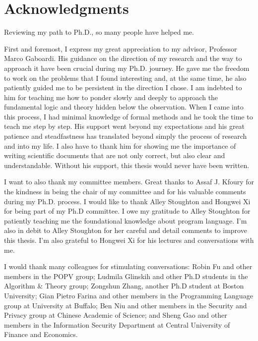 \section*{Acknowledgments}


Reviewing my path to Ph.D., so many people have helped me.


First and foremost, I express my great appreciation to my advisor, Professor Marco Gaboardi.
His guidance on the direction of my research and the way to approach it have been crucial during my Ph.D. journey.
He gave me the freedom to work on the problems that I found interesting and, at the same time,
he also patiently guided me to be persistent in the direction I chose.
I am indebted to him for teaching me how to ponder slowly and deeply to approach the fundamental logic and theory
hidden below the observation. When I came into this process, I had minimal knowledge of formal methods and he took the time to teach me step by step. 
His support went beyond my expectations and
his great patience and steadfastness has translated beyond simply the process of research and into my life. 
I also have to thank him for showing me the importance of writing scientific documents that are not only correct, but also clear and understandable.
Without his support, this thesis would never have been written.


I want to also thank my committee members.
Great thanks to Assaf J. Kfoury for the kindness in being the chair of my committee and for his valuable comments during my Ph.D. process.
I would like to thank Alley Stoughton and Hongwei Xi for being part of my Ph.D committee.
I owe my gratitude to Alley Stoughton for patiently teaching me the foundational knowledge
about program language.
I'm also in debit to Alley Stoughton for her careful and detail comments to improve this thesis.
I'm also grateful to Hongwei Xi for his lectures and conversations with me.




I would thank many colleagues for stimulating conversations:
Robin Fu and other members in the POPV group;
Ludmila Glinskih and other Ph.D students in the Algorithm \& Theory group; Zongshun Zhang, another Ph.D student at Boston University;
Gian Pietro Farina and other members in the Programming Language group at University at Buffalo;
Ben Niu and other members in the Security and Privacy group at Chinese Academic of Science;
and Sheng Gao and other members in the Information Security Department at Central University of Finance and
Economics.


